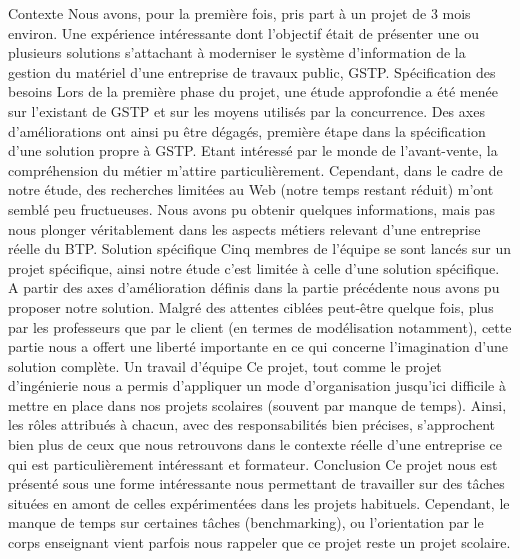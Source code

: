 Contexte
Nous avons, pour la première fois, pris part à un projet de 3 mois environ. Une expérience intéressante dont l’objectif était de présenter une ou plusieurs solutions s’attachant à moderniser le système d’information de la gestion du matériel d’une entreprise de travaux public, GSTP.
Spécification des besoins
Lors de la première phase du projet, une étude approfondie a été menée sur l’existant de GSTP et sur les moyens utilisés par la concurrence. Des axes d’améliorations ont ainsi pu être dégagés, première étape dans la spécification d’une solution propre à GSTP.
Etant intéressé par le monde de l’avant-vente, la compréhension du métier m’attire particulièrement. Cependant, dans le cadre de notre étude, des recherches limitées au Web (notre temps restant réduit) m’ont semblé peu fructueuses. Nous avons pu obtenir quelques informations, mais pas nous plonger véritablement dans les aspects métiers relevant d’une entreprise réelle du BTP.
Solution spécifique
Cinq membres de l’équipe se sont lancés sur un projet spécifique, ainsi notre étude c’est limitée à celle d’une solution spécifique. A partir des axes d’amélioration définis dans la partie précédente nous avons pu proposer notre solution.
Malgré des attentes ciblées peut-être quelque fois, plus par les professeurs que par le client (en termes de modélisation notamment), cette partie nous a offert une liberté importante en ce qui concerne l’imagination d’une solution complète.
Un travail d’équipe
Ce projet, tout comme le projet d’ingénierie nous a permis d’appliquer un mode d’organisation jusqu’ici difficile à mettre en place dans nos projets scolaires (souvent par manque de temps). Ainsi, les rôles attribués à chacun, avec des responsabilités bien précises, s’approchent bien plus de ceux que nous retrouvons dans le contexte réelle d’une entreprise ce qui est particulièrement intéressant et formateur.
Conclusion
Ce projet nous est présenté sous une forme intéressante nous permettant de travailler sur des tâches situées en amont de celles expérimentées dans les projets habituels. Cependant, le manque de temps sur certaines tâches (benchmarking), ou l’orientation par le corps enseignant vient parfois nous rappeler que ce projet reste un projet scolaire.


